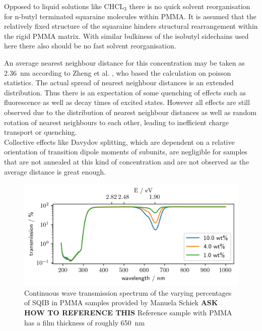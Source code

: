 \documentclass[twoside,openright]{scrreprt}
\begin{document}
Opposed to liquid solutions like $\mathrm{CHCL_3}$ there is no quick solvent reorganisation for n-butyl terminated squaraine molecules within PMMA. It is assumed that the relatively fixed structure of the squaraine hinders structural rearrangement within the rigid PMMA matrix. With similar bulkiness of the isobutyl sidechains used here there also should be no fast solvent reorganisation. \cite{Zheng2020}

An average nearest neighbour distance for this concentration may be taken as \SI{2.36}{\nano\meter} according to Zheng et al. \cite{Zheng2020}, who based the calculation on poisson statistics\cite{Krider2003}. The actual spread of nearest neighbour distances is an extended distribution. Thus there is an expectation of some quenching of effects such as fluorescence as well as decay times of excited states. However all effects are still observed due to the distribution of nearest neighbour distances as well as random rotation of nearest neighbours to each other, leading to inefficient charge transport or quenching.\cite{Zheng2020} \\
Collective effects like Davydov splitting, which are dependent on a relative orientation of transition dipole moments of subunits, are negligible for samples that are not annealed at this kind of concentration and are not observed as the average distance is great enough.\\

\begin{figure}[!htp]
\centering
\includegraphics[scale = 1]{images/SQIB_VarPercentInPMMA_transmission.png}
\caption{Continuous wave transmission spectrum of the varying percentages of SQIB in PMMA samples provided by Manuela Schiek\label{fig:VarpercentCWspectrum} \textbf{ASK HOW TO REFERENCE THIS} Reference sample with PMMA has a film thickness of roughly \SI{650}{\nano\meter}}
\end{figure}
\end{document}
